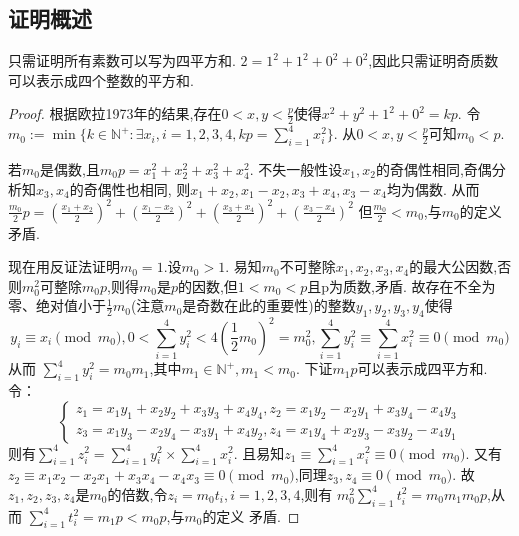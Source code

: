 \documentclass[main]{subfiles}
\begin{document}
\subsection{证明概述}
只需证明所有素数可以写为四平方和.
\(2=1^2 + 1^2 + 0^2 + 0^2\),因此只需证明奇质数可以表示成四个整数的平方和.
\begin{proof}
	根据欧拉1973年的结果,存在\(0<x,y<\frac{p}{2} \)使得\(x^2 + y^2 + 1^2 + 0^2=kp\).
	令\(m_0:=\min\{k \in \mathbb{N}^+:\exists x_i,i=1,2,3,4,kp=\sum_{i=1}^{4}x_i^2\}\).
	从\(0<x,y<\frac{p}{2}\)可知\(m_0 < p\).

	若\(m_0\)是偶数,且\(m_0 p = x_1^2 + x_2^2 + x_3^2 + x_4^2\).
	不失一般性设\(x_1,x_2\)的奇偶性相同,奇偶分析知\(x_3,x_4\)的奇偶性也相同,
	则\(x_1+x_2,x_1-x_2,x_3+x_4,x_3-x_4\)均为偶数.
	从而\(\frac{m_0}{2}p = \left(\frac{x_1+x_2}{2}\right)^2 + \left(\frac{x_1-x_2}{2}\right)^2 + \left(\frac{x_3+x_4}{2}\right)^2 + \left(\frac{x_3-x_4}{2}\right)^2\)
	但\(\frac{m_0}{2} < m_0\),与\(m_0\)的定义矛盾.

	现在用反证法证明\(m_0 = 1\).设\(m_0 > 1\).
	易知\(m_0\)不可整除\(x_1,x_2,x_3,x_4\)的最大公因数,否则\(m_0^2\)可整除\(m_0 p\),则得\(m_0\)是\(p\)的因数,但\(1 < m_0 < p\)且p为质数,矛盾.
	故存在不全为零、绝对值小于\(\frac{1}{2} m_0\)(注意\(m_0\)是奇数在此的重要性)的整数\(y_1,y_2,y_3,y_4\)使得
	\[
		y_i \equiv x_i \pmod{m_0},0 < \sum_{i=1}^{4} y_i^2 < 4 (\frac{1}{2} m_0 )^2 = m_0^2 ,\sum_{i=1}^{4} y_i^2 \equiv \sum_{i=1}^{4} x_i^2 \equiv 0 \pmod{m_0}
	\]
	从而 \(\sum_{i=1}^{4} y_i^2  = m_0 m_1\),其中\(m_1 \in \mathbb{N}^+,m_1 < m_0\).
	下证\(m_1 p\)可以表示成四平方和.
	令：
	\[
		\begin{cases}
			z_1=x_1 y_1 + x_2 y_2 + x_3 y_3 + x_4 y_4,z_2 = x_1 y_2 - x_2 y_1 + x_3 y_4 - x_4 y_3 \\
			z_3 = x_1 y_3 - x_2 y_4 -x_3 y_1 + x_4 y_2,z_4 = x_1 y_4 + x_2 y_3 -x_3 y_2 -x_4 y_1
		\end{cases}
	\]
	则有\(\sum_{i=1}^{4} z_i^2 = \sum_{i=1}^{4} y_i^2 \times \sum_{i=1}^{4} x_i^2\).
	且易知\(z_1 \equiv \sum_{i=1}^{4}x_i^2 \equiv 0 \pmod{m_0}\).
	又有\(z_2 \equiv x_1 x_2 - x_2 x_1 +x_3 x_4 - x_4 x_3 \equiv 0 \pmod{m_0}\),同理\(z_3,z_4 \equiv 0 \pmod{m_0}\).
	故\(z_1,z_2,z_3,z_4\)是\(m_0\)的倍数,令\(z_i = m_0 t_i,i=1,2,3,4\),则有
	\(m_0^2 \sum_{i=1}^{4} t_i^2 = m_0 m_1 m_0 p\),从而
	\(\sum_{i=1}^{4} t_i^2 = m_1 p < m_0 p\),与\(m_0\)的定义
	矛盾.
\end{proof}
\end{document}
